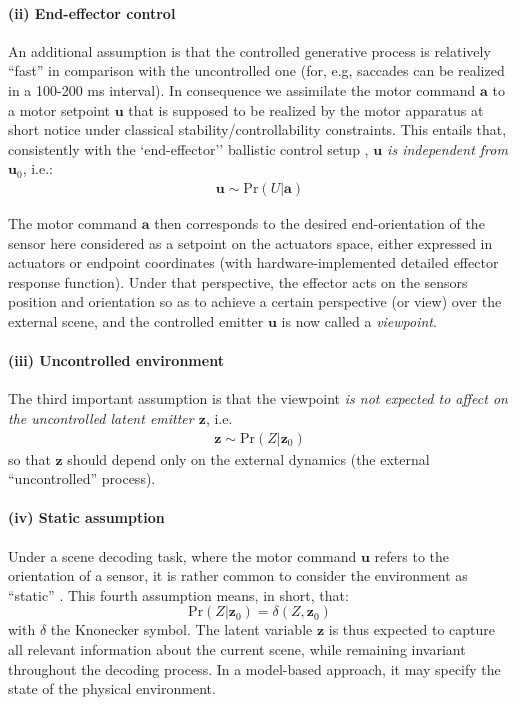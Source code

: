 \documentclass[12pt,twoside,openright]{article}
\begin{document}
\paragraph{(ii) End-effector control}
An additional assumption is that the controlled generative process is relatively ``fast'' in comparison with the uncontrolled one
(for, e.g, saccades can be realized in a 100-200 ms interval). 
In consequence we assimilate the motor command $\boldsymbol{a}$ to  a motor setpoint $\boldsymbol{u}$ that is supposed to be realized by the motor apparatus at short notice under classical stability/controllability constraints.
This entails that, consistently with the `end-effector'' ballistic control setup \cite{mussa2004neural},  \emph{$\boldsymbol{u}$ is independent from $\boldsymbol{u}_0$},
i.e.:
\begin{align*}
\boldsymbol{u}\sim\text{Pr}(U|\boldsymbol{a})
\end{align*}

The motor command $\boldsymbol{a}$ then corresponds to the desired end-orientation of the sensor here considered as a setpoint on the actuators space, either expressed in actuators or endpoint coordinates (with hardware-implemented detailed effector response function).  
Under that perspective, the effector acts on the sensors position and orientation so as to achieve a certain perspective (or view) over the external scene, and the controlled emitter $\boldsymbol{u}$ is now called a \emph{viewpoint}. 

\paragraph{(iii) Uncontrolled environment}
The third important assumption is that the viewpoint \emph{is not expected to affect on the uncontrolled latent emitter $\boldsymbol{z}$}, i.e.
\begin{align*}
\boldsymbol{z} \sim \text{Pr}(Z|\boldsymbol{z}_0)
\end{align*}
so that $\boldsymbol{z}$ should depend only on the external dynamics (the external ``uncontrolled'' process).

\paragraph{(iv) Static assumption}
Under a scene decoding  task, where the motor command $\boldsymbol{u}$ refers to the orientation of a sensor, it is rather common to consider the environment as ``static'' \cite{butko2010infomax}. This fourth assumption means, in short, that:
$$\text{Pr}(Z|\boldsymbol{z}_0) = \delta(Z, \boldsymbol{z}_0)$$ 
with $\delta$ the Knonecker symbol. 
The latent variable $\boldsymbol{z}$ is thus expected to capture all relevant information about the current scene, while remaining invariant throughout the decoding process. In a model-based approach, it may specify the state of the physical environment. 
\end{document}
